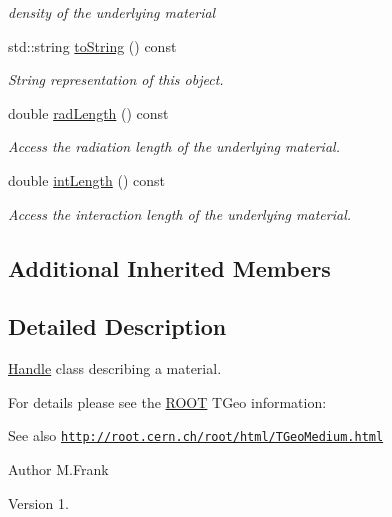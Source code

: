 \begin{DoxyCompactItemize}
\begin{DoxyCompactList}\small\item\em density of the underlying material \end{DoxyCompactList}\item 
std\+::string \hyperlink{class_d_d4hep_1_1_geometry_1_1_material_a87d90b949db042cbccaea167a640c643}{to\+String} () const
\begin{DoxyCompactList}\small\item\em String representation of this object. \end{DoxyCompactList}\item 
double \hyperlink{class_d_d4hep_1_1_geometry_1_1_material_a6aba801762277de94cb91603a87bb7ff}{rad\+Length} () const
\begin{DoxyCompactList}\small\item\em Access the radiation length of the underlying material. \end{DoxyCompactList}\item 
double \hyperlink{class_d_d4hep_1_1_geometry_1_1_material_a706e3df0aaafbd74da01f9132525f85b}{int\+Length} () const
\begin{DoxyCompactList}\small\item\em Access the interaction length of the underlying material. \end{DoxyCompactList}\end{DoxyCompactItemize}
\subsection*{Additional Inherited Members}


\subsection{Detailed Description}
\hyperlink{class_d_d4hep_1_1_handle}{Handle} class describing a material. 

For details please see the \hyperlink{namespace_r_o_o_t}{R\+O\+OT} T\+Geo information\+: \begin{DoxySeeAlso}{See also}
\href{http://root.cern.ch/root/html/TGeoMedium.html}{\tt http\+://root.\+cern.\+ch/root/html/\+T\+Geo\+Medium.\+html}
\end{DoxySeeAlso}
\begin{DoxyAuthor}{Author}
M.\+Frank 
\end{DoxyAuthor}
\begin{DoxyVersion}{Version}
1. 
\end{DoxyVersion}


